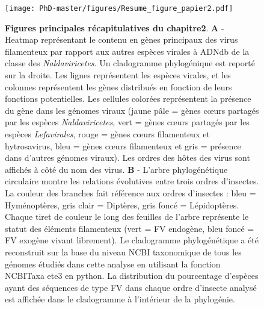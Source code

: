 \begin{figure}[!htpbt]
\captionsetup{font=footnotesize}
 \centering
  \texttt{[image: PhD-master/figures/Resume\_figure\_papier2.pdf]}
\caption[Paper2:Figures principales récapitulatives du chapitre2]{\footnotesize\textbf{Figures principales récapitulatives du chapitre2}. \textbf{A} - Heatmap représentant le contenu en gènes principaux des virus filamenteux par rapport aux autres espèces virales à ADNdb de la classe des \textit{Naldaviricetes}. Un cladogramme phylogénique est reporté sur la droite. Les lignes représentent les espèces virales, et les colonnes représentent les gènes distribués en fonction de leurs fonctions potentielles. Les cellules colorées représentent la présence du gène dans les génomes viraux (jaune pâle = gènes cœurs partagés par les espèces \textit{Naldaviricetes}, vert = gènes cœurs partagés par les espèces \textit{Lefavirales}, rouge = gènes cœurs filamenteux et hytrosavirus, bleu = gènes cœurs filamenteux et gris = présence dans d'autres génomes viraux). Les ordres des hôtes des virus sont affichés à côté du nom des virus. \textbf{B} - L'arbre phylogénétique circulaire montre les relations évolutives entre trois ordres d'insectes. La couleur des branches fait référence aux ordres d'insectes : bleu = Hyménoptères, gris clair = Diptères, gris foncé = Lépidoptères. Chaque tiret de couleur le long des feuilles de l'arbre représente le statut des éléments filamenteux (vert = FV endogène, bleu foncé = FV exogène vivant librement). Le cladogramme phylogénétique a été reconstruit sur la base du niveau NCBI taxonomique de tous les génomes étudiés dans cette analyse en utilisant la fonction NCBITaxa ete3 en python. La distribution du pourcentage d'espèces ayant des séquences de type FV dans chaque ordre d'insecte analysé est affichée dans le cladogramme à l'intérieur de la phylogénie.}
\label{figure:Resume_figure_papier2}
\end{figure}


